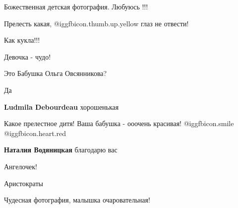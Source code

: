  
 
 
 
 

Божественная детская фотография. Любуюсь !!!

Прелесть какая,  @igg{fbicon.thumb.up.yellow}  глаз не отвести!

Как кукла!!!

Девочка - чудо!

Это Бабушка Ольга Овсянникова?

Да

\textbf{Ludmila Debourdeau} хорошенькая


Какое прелестное дитя! Ваша бабушка - ооочень красивая! @igg{fbicon.smile}
@igg{fbicon.heart.red}

\textbf{Наталия Водяницкая} благодарю вас

Ангелочек!

Аристократы

Чудесная фотография, малышка очаровательная!
